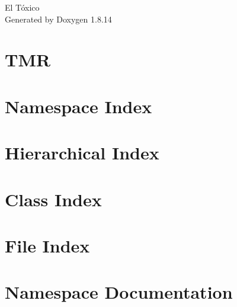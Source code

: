 \documentclass[twoside]{book}
\newcommand{\+}{\discretionary{\mbox{\scriptsize$\hookleftarrow$}}{}{}}
\newcommand{\clearemptydoublepage}{%
  \newpage{\pagestyle{empty}\cleardoublepage}%
}
\begin{document}
\hypersetup{pageanchor=false,
             bookmarksnumbered=true,
             pdfencoding=unicode
            }
\begin{titlepage}
\vspace*{7cm}
\begin{center}%
{\Large El Tóxico }\\
\vspace*{1cm}
{\large Generated by Doxygen 1.8.14}\\
\end{center}
\end{titlepage}
\clearemptydoublepage
{}
\tableofcontents
\clearemptydoublepage
{}
\hypersetup{pageanchor=true}

\chapter{T\+MR}
\label{index}\hypertarget{index}{}
\chapter{Namespace Index}

\chapter{Hierarchical Index}

\chapter{Class Index}

\chapter{File Index}

\chapter{Namespace Documentation}















\end{document}
